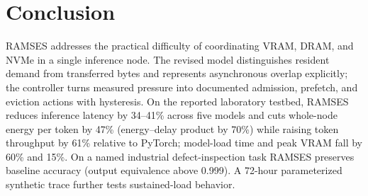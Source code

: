 \section{Conclusion}\label{sec:conclusion}
RAMSES addresses the practical difficulty of coordinating VRAM, DRAM, and NVMe in a single inference node. The revised model distinguishes resident demand from transferred bytes and represents asynchronous overlap explicitly; the controller turns measured pressure into documented admission, prefetch, and eviction actions with hysteresis. On the reported laboratory testbed, RAMSES reduces inference latency by 34--41\% across five models and cuts whole-node energy per token by 47\% (energy--delay product by 70\%) while raising token throughput by 61\% relative to PyTorch; model-load time and peak VRAM fall by 60\% and 15\%. On a named industrial defect-inspection task RAMSES preserves baseline accuracy (output equivalence above 0.999). A 72-hour parameterized synthetic trace further tests sustained-load behavior.

